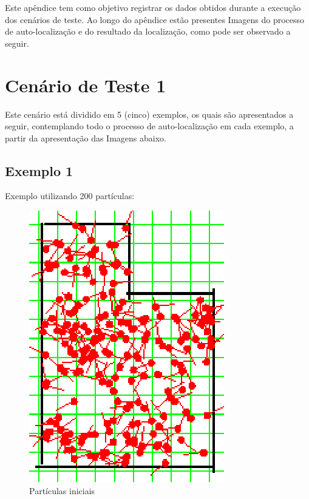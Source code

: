 
Este apêndice tem como objetivo registrar os dados obtidos durante a execução dos cenários de teste. Ao longo do apêndice estão presentes
Imagens do processo de auto-localização e do resultado da localização, como pode ser observado a seguir.

\section{Cenário de Teste 1}

Este cenário está dividido em 5 (cinco) exemplos, os quais são apresentados a seguir, contemplando todo o processo de auto-localização
em cada exemplo, a partir da apresentação das Imagens abaixo.

\subsection{Exemplo 1}

Exemplo utilizando 200 partículas:

\begin{figure}[H]
  \centering
  \includegraphics[scale=1]{figuras/cen1_ex1/1.eps}
  \caption[Partículas Iniciais]{Partículas iniciais}
  \label{img:cen1_ex1_1}
\end{figure}

